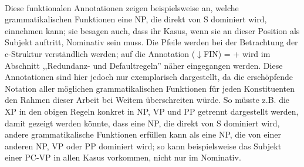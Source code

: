 \documentclass[12pt,a4paper]{article}
\begin{document}
\begin{singlespace}
\begin{tabular}{ l  l  c  c  c  c  c  c  c}
\end{tabular}\\
\newline
\end{singlespace}

Diese funktionalen Annotationen zeigen beispielsweise an, welche grammatikalischen Funktionen eine NP, die direkt von S dominiert wird, einnehmen kann; sie besagen auch, dass ihr Kasus, wenn sie an dieser Position als Subjekt auftritt, Nominativ sein muss. Die Pfeile werden bei der Betrachtung der c-Struktur verständlich werden; auf die Annotation ($\downarrow$FIN) = + wird im Abschnitt ,,Redundanz- und Defaultregeln'' näher eingegangen werden. Diese Annotationen sind hier jedoch nur exemplarisch dargestellt, da die erschöpfende Notation aller möglichen grammatikalischen Funktionen für jeden Konstituenten den Rahmen dieser Arbeit bei Weitem überschreiten würde. So müsste z.B. die XP in den obigen Regeln konkret in NP, VP und PP getrennt dargestellt werden, damit gezeigt werden könnte, dass eine NP, die direkt von S dominiert wird, andere grammatikalische Funktionen erfüllen kann als eine NP, die von einer anderen NP, VP oder PP dominiert wird; so kann beispielsweise das Subjekt einer PC-VP in allen Kasus vorkommen, nicht nur im Nominativ.
\end{document}

